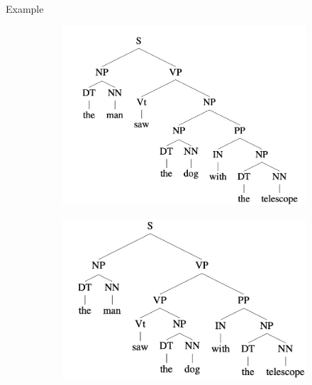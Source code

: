 \documentclass[usenames,dvipsnames,notes]{beamer}
\begin{document}
\begin{frame}
    {Example}
    \begin{figure}
        \begin{subfigure}[b]{0.45\textwidth}
            \includegraphics[width=\textwidth]{figures/parse-1.png}
        \end{subfigure}
        \begin{subfigure}[b]{0.45\textwidth}
            \includegraphics[width=\textwidth]{figures/parse-2.png}
        \end{subfigure}
    \end{figure}
\end{frame}
\end{document}
